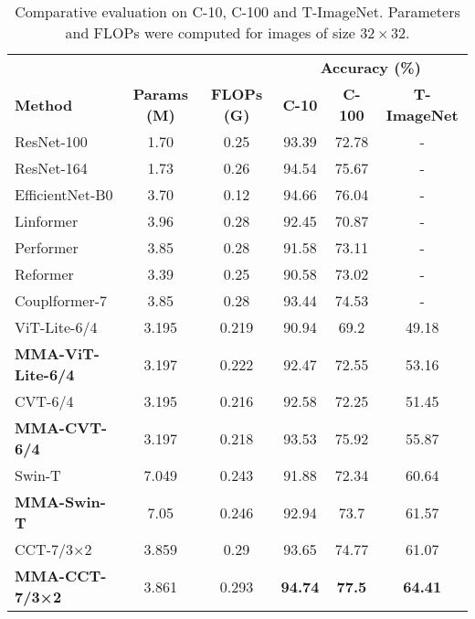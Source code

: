 \documentclass[10pt,twocolumn,letterpaper]{article}
\begin{document}
\begin{table*}[t]
\centering
\caption{Comparative evaluation on C-10, C-100 and T-ImageNet. Parameters and FLOPs were computed for images of size $32\times32$.}
\label{tab:image_small}
\setlength{\tabcolsep}{17pt}
\begin{tabular}{lccccc}
\hline
& & & \multicolumn{3}{c}{\textbf{Accuracy (\%)}}\\
\textbf{Method}  & \textbf{Params (M)} & \textbf{FLOPs (G)} & \textbf{C-10} & \textbf{C-100}  & \textbf{T-ImageNet} \\ 
\hline
ResNet-100 \cite{Author37} &1.70 & 0.25 & 93.39 & 72.78 & - \\
ResNet-164   \cite{Author37}    & 1.73  &    0.26   & 94.54  & 75.67 & -\\
EfficientNet-B0 \cite{Author39} & 3.70 & 0.12 & 94.66 & 76.04 & -  \\ \hline
Linformer \cite{Author33} & 3.96 & 0.28 & 92.45 & 70.87 & - \\
Performer \cite{Author35}& 3.85 & 0.28 & 91.58 & 73.11 & -\\
Reformer \cite{Author34} & 3.39 & 0.25 & 90.58 & 73.02 & - \\
Couplformer-7 \cite{Author36}& 3.85 & 0.28 & 93.44 &74.53 & -\\ \hline

ViT-Lite-6/4 \cite{Author1}     & 3.195   &    0.219   & 90.94  & 69.2 & 49.18\\
\textbf{MMA-ViT-Lite-6/4} &     3.197 &  0.222   & 92.47   &   72.55 & 53.16 \\ \hline
CVT-6/4 \cite{Author1}          &  3.195 &   0.216  & 92.58  & 72.25   & 51.45\\
\textbf{MMA-CVT-6/4}      &  3.197  &        0.218   & 93.53  &     75.92  & 55.87\\ 
\hline
Swin-T \cite{Author9}          & 7.049 & 0.243 & 91.88  & 72.34   & 60.64 \\
\textbf{MMA-Swin-T}      & 7.05 & 0.246 &  92.94 &  73.7  & 61.57 \\ 
\hline
CCT-7/3×2 \cite{Author1}        & 3.859 &  0.29  & 93.65  & 74.77  & 61.07 \\
\textbf{MMA-CCT-7/3×2}   &  3.861  &   0.293     & \textbf{94.74} & \textbf{77.5} & \textbf{64.41}\\ 
\hline
\end{tabular}
\end{table*}
\end{document}
